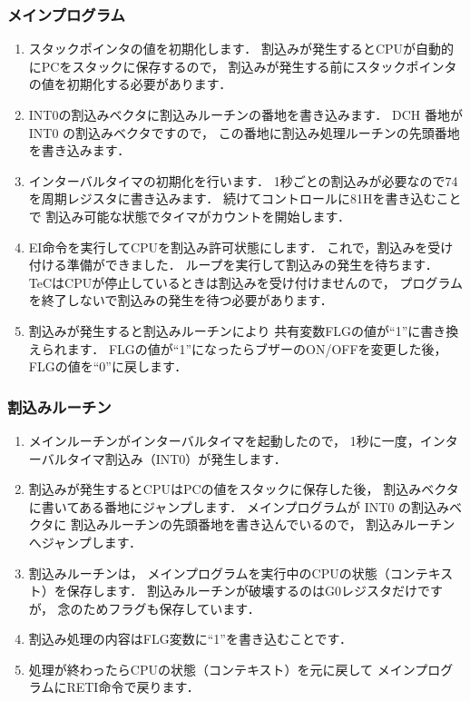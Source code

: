 \subsubsection{メインプログラム}
\begin{enumerate}
\item スタックポインタの値を初期化します．
割込みが発生するとCPUが自動的にPCをスタックに保存するので，
割込みが発生する前にスタックポインタの値を初期化する必要があります．

\item INT0の割込みベクタに割込みルーチンの番地を書き込みます．
DCH 番地が INT0 の割込みベクタですので，
この番地に割込み処理ルーチンの先頭番地を書き込みます．

\item インターバルタイマの初期化を行います．
1秒ごとの割込みが必要なので74を周期レジスタに書き込みます．
続けてコントロールに81Hを書き込むことで
割込み可能な状態でタイマがカウントを開始します．

\item EI命令を実行してCPUを割込み許可状態にします．
これで，割込みを受け付ける準備ができました．
ループを実行して割込みの発生を待ちます．
TeCはCPUが停止しているときは割込みを受け付けませんので，
プログラムを終了しないで割込みの発生を待つ必要があります．

\item 割込みが発生すると割込みルーチンにより
共有変数FLGの値が``1''に書き換えられます．
FLGの値が``1''になったらブザーのON/OFFを変更した後，
FLGの値を``0''に戻します．
\end{enumerate}

\subsubsection{割込みルーチン}
\begin{enumerate}
\item メインルーチンがインターバルタイマを起動したので，
1秒に一度，インターバルタイマ割込み（INT0）が発生します．

\item 割込みが発生するとCPUはPCの値をスタックに保存した後，
割込みベクタに書いてある番地にジャンプします．
メインプログラムが INT0 の割込みベクタに
割込みルーチンの先頭番地を書き込んでいるので，
割込みルーチンへジャンプします．

\item 割込みルーチンは，
メインプログラムを実行中のCPUの状態（コンテキスト）を保存します．
割込みルーチンが破壊するのはG0レジスタだけですが，
念のためフラグも保存しています．

\item 割込み処理の内容はFLG変数に``1''を書き込むことです．

\item 処理が終わったらCPUの状態（コンテキスト）を元に戻して
メインプログラムにRETI命令で戻ります．
\end{enumerate}

